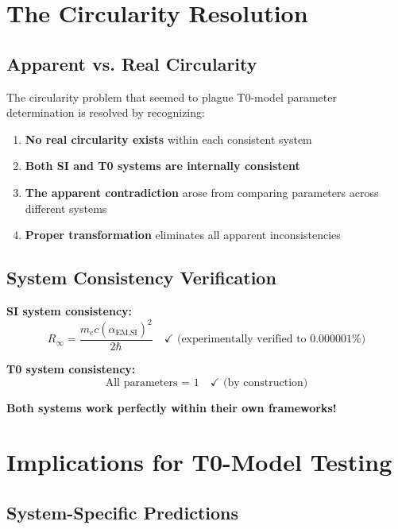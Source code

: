 \documentclass[12pt,a4paper]{article}
\newcommand{\Rzero}{R_\infty}
\newcommand{\alphaEMSI}{\alpha_{\text{EM,SI}}}
\begin{document}
	\section{The Circularity Resolution}
	\label{sec:circularity_resolution}
	
	\subsection{Apparent vs. Real Circularity}
	\label{subsec:apparent_real_circularity}
	
	The circularity problem that seemed to plague T0-model parameter determination is resolved by recognizing:
	
	\begin{enumerate}
		\item \textbf{No real circularity exists} within each consistent system
		\item \textbf{Both SI and T0 systems are internally consistent}
		\item \textbf{The apparent contradiction} arose from comparing parameters across different systems
		\item \textbf{Proper transformation} eliminates all apparent inconsistencies
	\end{enumerate}
	
	\subsection{System Consistency Verification}
	\label{subsec:system_consistency}
	
	\textbf{SI system consistency:}
	$$\Rzero = \frac{m_e c \left(\alphaEMSI\right)^2}{2\hbar} \quad \checkmark \text{ (experimentally verified to 0.000001\%)}$$
	
	\textbf{T0 system consistency:}
	$$\text{All parameters = 1} \quad \checkmark \text{ (by construction)}$$
	
	\textbf{Both systems work perfectly within their own frameworks!}
	
	\section{Implications for T0-Model Testing}
	\label{sec:testing_implications}
	
	\subsection{System-Specific Predictions}
	\label{subsec:system_specific_predictions}
	
\end{document}
